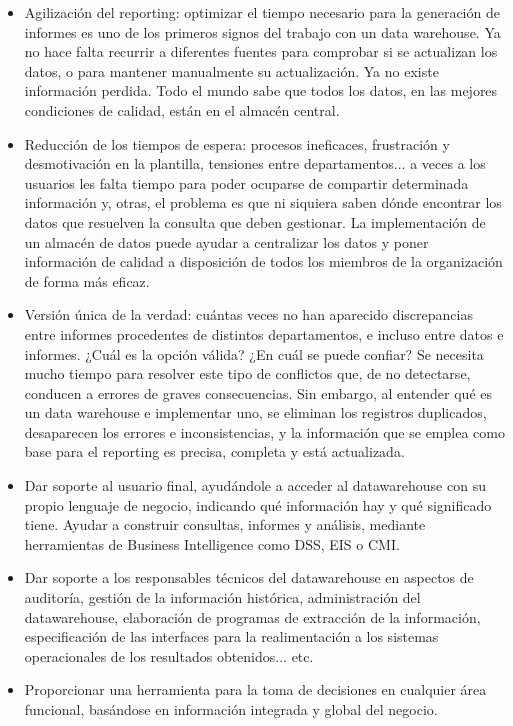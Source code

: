 \documentclass[11pt,a4paper]{article}
\begin{document}
				\begin{itemize}
					\item Agilización del reporting: optimizar el tiempo necesario para la generación de informes es uno de los primeros signos del trabajo con un data warehouse. Ya no hace falta recurrir a diferentes fuentes para comprobar si se actualizan los datos, o para mantener manualmente su actualización. Ya no existe información perdida. Todo el mundo sabe que todos los datos, en las mejores condiciones de calidad, están en el almacén central.
					
					\item Reducción de los tiempos de espera: procesos ineficaces, frustración y desmotivación en la plantilla, tensiones entre departamentos...  a veces a los usuarios les falta tiempo para poder ocuparse de compartir determinada información y, otras, el problema es que ni siquiera saben dónde encontrar los datos que resuelven la consulta que deben gestionar. La implementación de un almacén de datos puede ayudar a centralizar los datos y poner información de calidad a disposición de todos los miembros de la organización de forma más eficaz.
					
					\item Versión única de la verdad: cuántas veces no han aparecido discrepancias entre informes procedentes de distintos departamentos, e incluso entre datos e informes. ¿Cuál es la opción válida? ¿En cuál se puede confiar? Se necesita mucho tiempo para resolver este tipo de conflictos que, de no detectarse, conducen a errores de graves consecuencias. Sin embargo, al entender qué es un data warehouse e implementar uno, se eliminan los registros duplicados, desaparecen los errores e inconsistencias, y la información que se emplea como base para el reporting es precisa, completa y está actualizada.
					
					\item Dar soporte al usuario final, ayudándole a acceder al datawarehouse con su propio lenguaje de negocio, indicando qué información hay y qué significado tiene. Ayudar a construir consultas, informes y análisis, mediante herramientas de Business Intelligence como DSS, EIS o CMI.
					
					\item Dar soporte a los responsables técnicos del datawarehouse en aspectos de auditoría, gestión de la información histórica, administración del datawarehouse, elaboración de programas de extracción de la información, especificación de las interfaces para la realimentación a los sistemas operacionales de los resultados obtenidos... etc.
					
					\item Proporcionar una herramienta para la toma de decisiones en cualquier área funcional, basándose en información integrada y global del negocio.
					
					
				\end{itemize}
			
			

		
		
		\newpage

		
		
		
	
\end{document}

